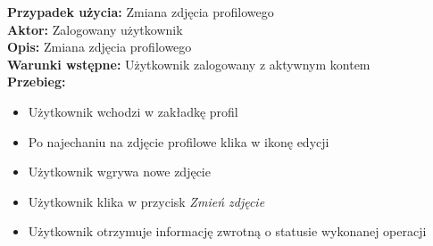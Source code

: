 \noindent
\textbf{Przypadek użycia:} Zmiana zdjęcia profilowego\\
\textbf{Aktor:} Zalogowany użytkownik\\
\textbf{Opis:} Zmiana zdjęcia profilowego\\
\textbf{Warunki wstępne:} Użytkownik zalogowany z aktywnym kontem\\
\textbf{Przebieg:}
\begin{itemize}
    \item Użytkownik wchodzi w zakładkę profil
    \item Po najechaniu na zdjęcie profilowe klika w ikonę edycji
    \item Użytkownik wgrywa nowe zdjęcie
    \item Użytkownik klika w przycisk \textit{Zmień zdjęcie}
    \item Użytkownik otrzymuje informację zwrotną o statusie wykonanej operacji
\end{itemize}



